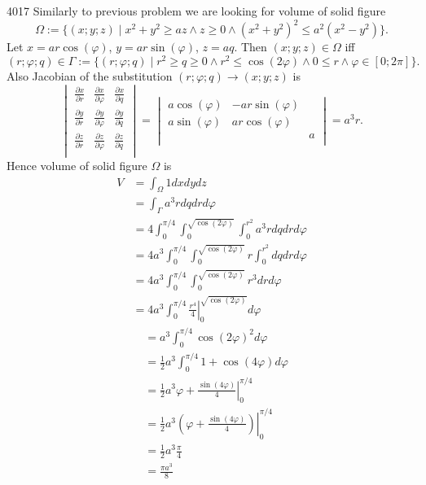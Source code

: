 \documentclass[12pt,a4paper]{article}
\begin{document}
    \begin{problem}{4017}
        Similarly to previous problem we are looking for volume of solid figure
        \[\Omega := \{(x; y; z) \mid x^2 + y^2 \geqslant az \wedge z \geqslant 0 \wedge (x^2 + y^2)^2 \leqslant a^2 (x^2 - y^2)\}.\]
        Let $x = ar \cos(\varphi)$, $y = ar \sin(\varphi)$, $z = aq$. Then $(x; y; z) \in \Omega$ iff
        \[
            (r; \varphi; q) \in \Gamma := \{(r; \varphi; q) \mid r^2 \geqslant q \geqslant 0 \wedge r^2 \leqslant \cos(2\varphi) \wedge 0 \leqslant r \wedge \varphi \in [0; 2\pi]\}.
        \]
        Also Jacobian of the substitution $(r; \varphi; q) \to (x; y; z)$ is
        \[
            \begin{vmatrix}
                \frac{\partial x}{\partial r}& \frac{\partial x}{\partial \varphi}& \frac{\partial x}{\partial q}\\
                \frac{\partial y}{\partial r}& \frac{\partial y}{\partial \varphi}& \frac{\partial y}{\partial q}\\
                \frac{\partial z}{\partial r}& \frac{\partial z}{\partial \varphi}& \frac{\partial z}{\partial q}\\
            \end{vmatrix}
            =
            \begin{vmatrix}
                a\cos(\varphi)& -ar\sin(\varphi)& \\
                a\sin(\varphi)& ar\cos(\varphi)& \\
                & & a\\
            \end{vmatrix}
            = a^3 r.
        \]
        Hence volume of solid figure $\Omega$ is
        \begin{align*}
            V
            &= \int_\Omega 1 dx dy dz\\
            &= \int_\Gamma a^3 r dq dr d\varphi\\
            &= 4\int_0^{\pi/4} \int_0^{\sqrt{\cos(2\varphi)}} \int_0^{r^2} a^3 r dq dr d\varphi\\
            &= 4a^3 \int_0^{\pi/4} \int_0^{\sqrt{\cos(2\varphi)}} r \int_0^{r^2} dq dr d\varphi\\
            &= 4a^3 \int_0^{\pi/4} \int_0^{\sqrt{\cos(2\varphi)}} r^3 dr d\varphi\\
            &= 4a^3 \int_0^{\pi/4} \left. \frac{r^4}{4} \right|_0^{\sqrt{\cos(2\varphi)}} d\varphi
        \end{align*}
        \begin{align*}
            &= a^3 \int_0^{\pi/4} \cos(2\varphi)^2 d\varphi\\
            &= \frac{1}{2} a^3 \int_0^{\pi/4} 1 + \cos(4\varphi) d\varphi\\
            &= \frac{1}{2} a^3 \left. \varphi + \frac{\sin(4\varphi)}{4} \right|_0^{\pi/4}\\
            &= \frac{1}{2} a^3 \left.\left( \varphi + \frac{\sin(4\varphi)}{4} \right)\right|_0^{\pi/4}\\
            &= \frac{1}{2} a^3 \frac{\pi}{4}\\
            &= \frac{\pi a^3}{8}
        \end{align*}
    \end{problem}
\end{document}
